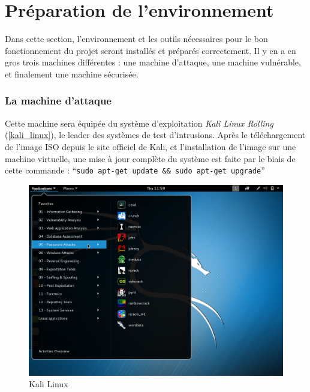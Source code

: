
\newpage

\section{Préparation de l'environnement} \label{preparation_environnement}
Dans cette section, l'environnement et les outils nécessaires pour le bon fonctionnement du projet seront installés
et préparés correctement. Il y en a en gros trois machines différentes : une machine d'attaque, une machine vulnérable,
et finalement une machine sécurisée. %

    \subsubsection{La machine d'attaque} 
    Cette machine sera équipée du système d'exploitation \emph{Kali Linux \cite{linux} Rolling} 
    (\autoref{kali_linux}), le 
    leader des systèmes de test d'intrusions. Après le téléchargement de l'image
    ISO depuis le site officiel de Kali, et l'installation de l'image sur
    une machine virtuelle, une mise à jour complète du système est faite par le biais de cette commande : 
    ``\texttt{sudo apt-get update \&\& sudo apt-get upgrade}''  %

    \begin{figure}[h!]
        \centering
        \includegraphics[width=\linewidth]{images/kali_linux.png}
        \caption{Kali Linux}
        \label{kali_linux}
    \end{figure}

